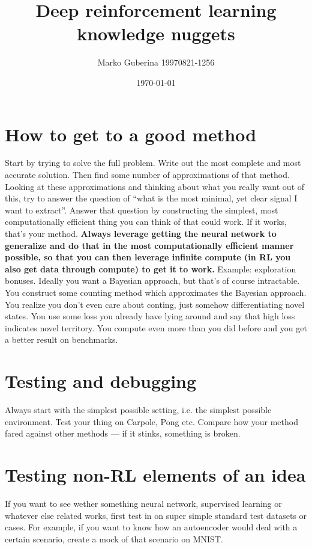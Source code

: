 \documentclass{article}
\title{Deep reinforcement learning knowledge nuggets}
\date{\today}
\author{Marko Guberina 19970821-1256}
\begin{document}
\maketitle

\section{How to get to a good method}
Start by trying to solve the full problem.
Write out the most complete and most accurate solution.
Then find some number of approximations of that method.
Looking at these approximations and thinking about what you really want out of this,
try to answer the question of ``what is the most minimal, yet clear signal I want to extract''.
Answer that question by constructing the simplest,
most computationally efficient thing you can think of that could work.
If it works, that's your method. 
\textbf{Always leverage getting the neural network to generalize and do that in the most computationally efficient
manner possible, so that you can then leverage infinite compute (in RL you also get data through compute) to get it to work.}
Example: exploration bonuses.
Ideally you want a Bayesian approach, but that's of course intractable.
You construct some counting method which approximates the Bayesian approach.
You realize you don't even care about conting, just somehow differentiating novel states.
You use some loss you already have lying around and say that high loss indicates novel territory.
You compute even more than you did before and you get a better result on benchmarks.

\section{Testing and debugging}
Always start with the simplest possible setting, i.e. the simplest possible environment.
Test your thing on Carpole, Pong etc.
Compare how your method fared against other methods --- if it stinks, something is broken.

\section{Testing non-RL elements of an idea}
If you want to see wether something neural network, supervised learning or whatever else related
works, first test in on super simple standard test datasets or cases.
For example, if you want to know how an autoencoder would deal with a certain scenario,
create a mock of that scenario on MNIST.
\end{document}
